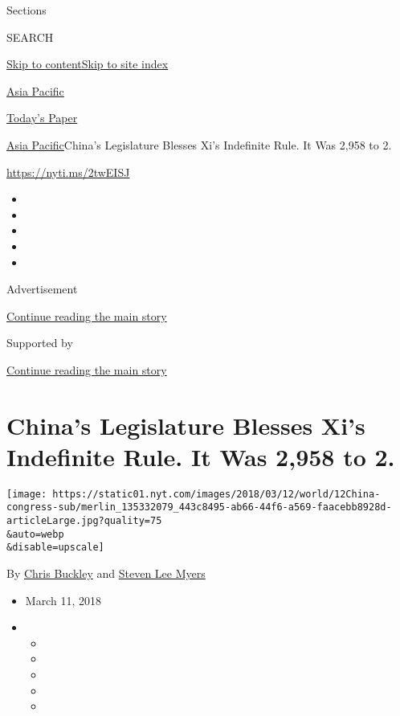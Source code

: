 Sections

SEARCH

\protect\hyperlink{site-content}{Skip to
content}\protect\hyperlink{site-index}{Skip to site index}

\href{https://www.nytimes.com/section/world/asia}{Asia Pacific}

\href{https://myaccount.nytimes.com/auth/login?response_type=cookie\&client_id=vi}{}

\href{https://www.nytimes.com/section/todayspaper}{Today's Paper}

\href{/section/world/asia}{Asia Pacific}\textbar{}China's Legislature
Blesses Xi's Indefinite Rule. It Was 2,958 to 2.

\url{https://nyti.ms/2twEISJ}

\begin{itemize}
\item
\item
\item
\item
\item
\end{itemize}

Advertisement

\protect\hyperlink{after-top}{Continue reading the main story}

Supported by

\protect\hyperlink{after-sponsor}{Continue reading the main story}

\hypertarget{chinas-legislature-blesses-xis-indefinite-rule-it-was-2958-to-2}{%
\section{China's Legislature Blesses Xi's Indefinite Rule. It Was 2,958
to
2.}\label{chinas-legislature-blesses-xis-indefinite-rule-it-was-2958-to-2}}

\texttt{[image: https://static01.nyt.com/images/2018/03/12/world/12China-congress-sub/merlin\_135332079\_443c8495-ab66-44f6-a569-faacebb8928d-articleLarge.jpg?quality=75\\\&auto=webp\\\&disable=upscale]}

By \href{https://www.nytimes.com/by/chris-buckley}{Chris Buckley} and
\href{https://www.nytimes.com/by/steven-lee-myers}{Steven Lee Myers}

\begin{itemize}
\item
  March 11, 2018
\item
  \begin{itemize}
  \item
  \item
  \item
  \item
  \item
  \end{itemize}
\end{itemize}

